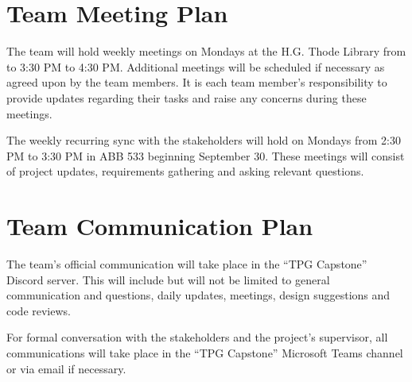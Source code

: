 \documentclass{article}
\begin{document}

\section{Team Meeting Plan}
The team will hold weekly meetings on Mondays at the H.G. Thode Library from to 3:30 PM to 4:30 PM. Additional meetings will be scheduled if necessary as agreed upon by the team members. It is each team member’s responsibility to provide updates regarding their tasks and raise any concerns during these meetings. 

\vspace*{10pt}

\noindent The weekly recurring sync with the stakeholders will hold on Mondays from 2:30 PM to 3:30 PM in ABB 533 beginning September 30. These meetings will consist of project updates, requirements gathering and asking relevant questions.

\section{Team Communication Plan}
The team’s official communication will take place in the “TPG Capstone” Discord server. This will include but will not be limited to general communication and questions, daily updates, meetings, design suggestions and code reviews.

\vspace*{10pt}

\noindent For formal conversation with the stakeholders and the project’s supervisor, all communications will take place in the “TPG Capstone” Microsoft Teams channel or via email if necessary.
\end{document}
